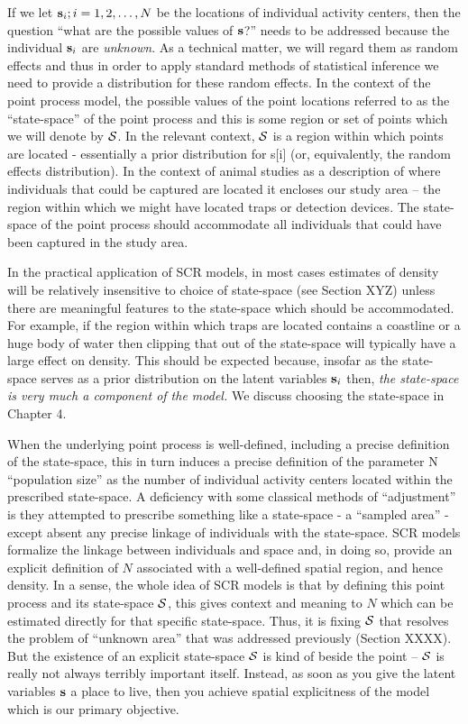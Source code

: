 If we let ${\bf s}_{i}; i=1,2,\ldots,N$ be the locations of individual
activity centers, then the question ``what are the possible values of
${\bf s}$?'' needs to be addressed because the individual ${\bf
  s}_{i}$ are {\it unknown}. As a technical matter, we will regard
them as random effects and thus in order to apply standard methods of
statistical inference we need to provide a distribution for these
random effects.  In the context of the point process model, the
possible values of the point locations referred to as the
``state-space'' of the point process and this is some region or set of
points which we will denote by ${\cal S}$. In the relevant context,
${\cal S}$ is a region within which points are located - essentially a
prior distribution for s[i] (or, equivalently, the random effects
distribution). In the context of animal studies as a description of
where individuals that could be captured are located it encloses our
study area -- the region within which we might have located traps or
detection devices.  The state-space of the point process should
accommodate all individuals that could have been captured in the study
area.

In the practical application of SCR models, in most cases estimates of
density will be relatively insensitive to choice of state-space (see
Section XYZ) unless there are meaningful features to the state-space
which should be accommodated. For example, if the region within which
traps are located contains a coastline or a huge body of water then
clipping that out of the state-space will typically have a large
effect on density. This should be expected because, insofar as the
state-space serves as a prior distribution on the latent variables
${\bf s}_{i}$ then, {\it the state-space is very much a
  component of the model. } We discuss choosing the state-space in
Chapter 4.

When the underlying point process is well-defined, including a precise
definition of the state-space, this in turn induces a precise
definition of the parameter N ``population size'' as the number of
individual activity centers located within the prescribed state-space.
A deficiency with some classical methods of ``adjustment'' is they
attempted to prescribe something like a state-space - a ``sampled
area'' - except absent any precise linkage of individuals with the
state-space. SCR models formalize the linkage between individuals and
space and, in doing so, provide an explicit definition of $N$
associated with 
a well-defined spatial region, and hence
density. In a sense, the whole idea of SCR models is that by defining
this point process and its state-space ${\cal S}$, this gives context and
meaning to $N$ which can be estimated directly for that specific
state-space. Thus, it is fixing ${\cal S}$ that resolves the problem of
``unknown area'' that was addressed previously (Section XXXX). But the
existence of an explicit state-space ${\cal S}$ is kind of beside the
point -- ${\cal S}$ is really not always terribly important
itself. Instead, as soon as you give the latent variables ${\bf s}$ a
place to live, then you achieve spatial explicitness of the model
which is our primary objective.





